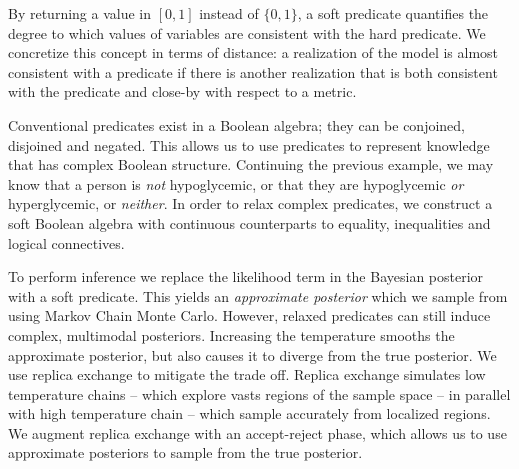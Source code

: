 By returning a value in $[0, 1]$ instead of $\{0, 1\}$, a soft predicate quantifies the degree to which values of variables are consistent with the hard predicate.
We concretize this concept in terms of distance: a realization of the model is almost consistent with a predicate if there is another realization that is both consistent with the predicate and close-by with respect to a metric.

Conventional predicates exist in a Boolean algebra; they can be conjoined, disjoined and negated.
This allows us to use predicates to represent knowledge that has complex Boolean structure.
Continuing the previous example, we may know that a person is \emph{not} hypoglycemic, or that they are hypoglycemic \emph{or} hyperglycemic, or \emph{neither}.
In order to relax complex predicates, we construct a soft Boolean algebra with continuous counterparts to equality, inequalities and logical connectives.

To perform inference we replace the likelihood term in the Bayesian posterior with a soft predicate.
This yields an \emph{approximate posterior} which we sample from using Markov Chain Monte Carlo.
However, relaxed predicates can still induce complex, multimodal posteriors.
Increasing the temperature smooths the approximate posterior, but also causes it to diverge from the true posterior.
We use replica exchange to mitigate the trade off. 
Replica exchange simulates low temperature chains -- which explore vasts regions of the sample space -- in parallel with high temperature chain -- which sample accurately from localized regions.
We augment replica exchange with an accept-reject phase, which allows us to use approximate posteriors to sample from the true posterior.




